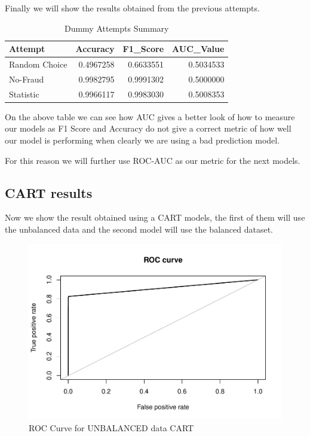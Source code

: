 \documentclass[
]{article}
\begin{document}
Finally we will show the results obtained from the previous attempts.

\begin{table}[!h]

\caption{\label{tab:dummy_compare}Dummy Attempts Summary}
\centering
\fontsize{10}{12}\selectfont
\begin{tabular}[t]{lrrr}
\toprule
Attempt & Accuracy & F1\_Score & AUC\_Value\\
\midrule
Random Choice & 0.4967258 & 0.6633551 & 0.5034533\\
No-Fraud & 0.9982795 & 0.9991302 & 0.5000000\\
Statistic & 0.9966117 & 0.9983030 & 0.5008353\\
\bottomrule
\end{tabular}
\end{table}

On the above table we can see how AUC gives a better look of how to
measure our models as F1 Score and Accuracy do not give a correct metric
of how well our model is performing when clearly we are using a bad
prediction model.

For this reason we will further use ROC-AUC as our metric for the next
models.

\hypertarget{cart-results}{%
\subsection{CART results}\label{cart-results}}

Now we show the result obtained using a CART models, the first of them
will use the unbalanced data and the second model will use the balanced
dataset.

\begin{figure}[H]

{\centering \includegraphics[width=0.7\linewidth]{fraudDetectionReport_files/figure-latex/CART_unbalanced-1} 

}

\caption{ROC Curve for UNBALANCED data CART}\label{fig:CART_unbalanced}
\end{figure}
\end{document}
